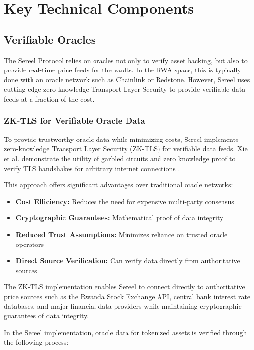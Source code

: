 \documentclass[12pt]{article}
\begin{document}
\section{Key Technical Components}

\subsection{Verifiable Oracles}
The Sereel Protocol relies on oracles not only to verify asset backing, but also to provide real-time price feeds for the vaults. In the RWA space, this is typically done with an oracle network such as Chainlink or Redstone. However, Sereel uses cutting-edge zero-knowledge Transport Layer Security to provide verifiable data feeds at a fraction of the cost. 

\subsubsection{ZK-TLS for Verifiable Oracle Data}

To provide trustworthy oracle data while minimizing costs, Sereel implements zero-knowledge Transport Layer Security (ZK-TLS) for verifiable data feeds. Xie et al. demonstrate the utility of garbled circuits and zero knowledge proof to verify TLS handshakes for arbitrary internet connections \cite{xie2023zktls}.

This approach offers significant advantages over traditional oracle networks:

\begin{itemize}
  \item \textbf{Cost Efficiency:} Reduces the need for expensive multi-party consensus
  \item \textbf{Cryptographic Guarantees:} Mathematical proof of data integrity
  \item \textbf{Reduced Trust Assumptions:} Minimizes reliance on trusted oracle operators
  \item \textbf{Direct Source Verification:} Can verify data directly from authoritative sources
\end{itemize}

The ZK-TLS implementation enables Sereel to connect directly to authoritative price sources such as the Rwanda Stock Exchange API, central bank interest rate databases, and major financial data providers while maintaining cryptographic guarantees of data integrity.

In the Sereel implementation, oracle data for tokenized assets is verified through the following process:
\end{document}
